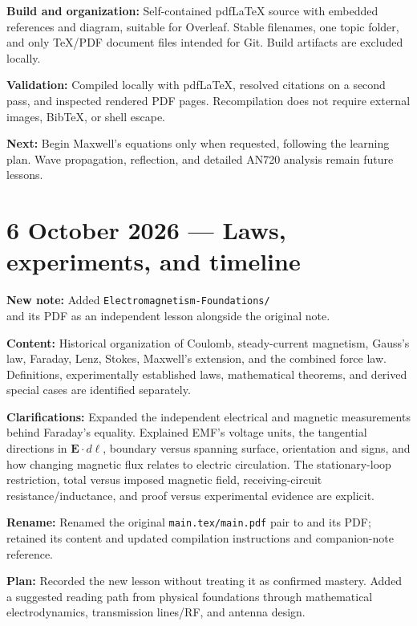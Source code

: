 \documentclass[11pt,letterpaper]{article}
\begin{document}
\textbf{Build and organization:} Self-contained pdfLaTeX source with embedded references and diagram, suitable for Overleaf. Stable filenames, one topic folder, and only TeX/PDF document files intended for Git. Build artifacts are excluded locally.

\textbf{Validation:} Compiled locally with pdfLaTeX, resolved citations on a second pass, and inspected rendered PDF pages. Recompilation does not require external images, BibTeX, or shell escape.

\textbf{Next:} Begin Maxwell's equations only when requested, following the learning plan. Wave propagation, reflection, and detailed AN720 analysis remain future lessons.

\newpage
\section*{6 October 2026 --- Laws, experiments, and timeline}
\textbf{New note:} Added \texttt{Electromagnetism-Foundations/}\\
 and its PDF as an independent lesson alongside the original note.

\textbf{Content:} Historical organization of Coulomb, steady-current magnetism, Gauss's law, Faraday, Lenz, Stokes, Maxwell's extension, and the combined force law. Definitions, experimentally established laws, mathematical theorems, and derived special cases are identified separately.

\textbf{Clarifications:} Expanded the independent electrical and magnetic measurements behind Faraday's equality. Explained EMF's voltage units, the tangential directions in $\mathbf E\cdot d\boldsymbol\ell$, boundary versus spanning surface, orientation and signs, and how changing magnetic flux relates to electric circulation. The stationary-loop restriction, total versus imposed magnetic field, receiving-circuit resistance/inductance, and proof versus experimental evidence are explicit.

\textbf{Rename:} Renamed the original \texttt{main.tex/main.pdf} pair to  and its PDF; retained its content and updated compilation instructions and companion-note reference.

\textbf{Plan:} Recorded the new lesson without treating it as confirmed mastery. Added a suggested reading path from physical foundations through mathematical electrodynamics, transmission lines/RF, and antenna design.
\end{document}
